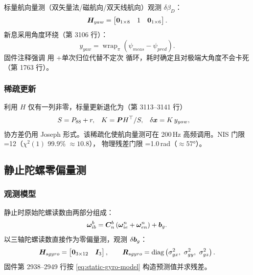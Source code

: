标量航向量测（双矢量法/磁航向/双天线航向）观测 $\delta\beta_D$：
\begin{equation}
  \boldsymbol{H}_{yaw} = \begin{bmatrix} \boldsymbol{0}_{1\times8} & 1 &
    \boldsymbol{0}_{1\times6} \end{bmatrix}.
  \label{eq:H-yaw}
\end{equation}
新息采用角度环绕（第 3106 行）：
\begin{equation}
  y_{yaw} = \operatorname{wrap}_{\pi}\left(\psi_{meas} - \psi_{pred}\right).
  \label{eq:y-yaw}
\end{equation}
固件注释强调  用 +单次归位代替不定次
 循环，耗时确定且对极端大角度不会卡死（第 1763 行）。

\subsubsection{稀疏更新}

利用 $H$ 仅有一列非零，标量更新退化为（第 3113--3141 行）
\begin{align}
  S &= P_{88} + r, &
  K &= \boldsymbol{P}H^{\top} / S, &
  \delta\boldsymbol{x} &= K\,y_{yaw},
  \label{eq:yaw-scalar-update}
\end{align}
协方差仍用 Joseph 形式。该稀疏化使航向量测可在 200\,Hz 高频调用。NIS 门限
=12（$\chi^2(1)$ 99.9\% $\approx10.8$），
物理残差门限 =1.0\,rad（$\approx57°$）。

\subsection{静止陀螺零偏量测}

\subsubsection{观测模型}

静止时原始陀螺读数由两部分组成：
\begin{equation}
  \boldsymbol{\omega}_{ib}^b = \boldsymbol{C}_n^b\left(\boldsymbol{\omega}_{ie}^n
    + \boldsymbol{\omega}_{en}^n\right) + \boldsymbol{b}_g.
  \label{eq:static-gyro-model}
\end{equation}
以三轴陀螺读数直接作为零偏量测，观测 $\delta\boldsymbol{b}_g$：
\begin{equation}
  \m{H}_{sgyro} = \begin{bmatrix} \m{0}_{3\times12} & \m{I}_3 \end{bmatrix},
  \qquad
  \m{R}_{sgyro} = \diag\left(\sigma_{gx}^2,\ \sigma_{gy}^2,\ \sigma_{gz}^2\right).
  \label{eq:H-R-sgyro}
\end{equation}
固件第 2938--2949 行按 \cref{eq:static-gyro-model} 构造预测值并求残差。

